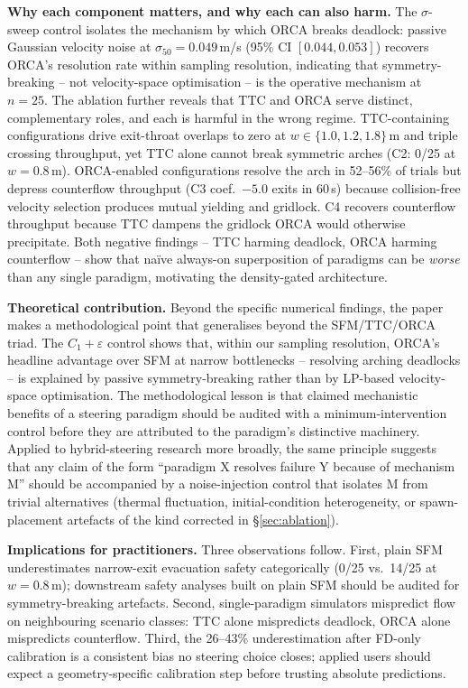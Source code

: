 \documentclass[a4paper,twoside]{article}
\begin{document}
\textbf{Why each component matters, and why each can also harm.}
The $\sigma$-sweep control isolates the mechanism by which ORCA breaks deadlock: passive Gaussian velocity noise at $\sigma_{50}=0.049$\,m/s (95\% CI $[0.044,0.053]$) recovers ORCA's resolution rate within sampling resolution, indicating that symmetry-breaking -- not velocity-space optimisation -- is the operative mechanism at $n=25$. The ablation further reveals that TTC and ORCA serve distinct, complementary roles, and each is harmful in the wrong regime. TTC-containing configurations drive exit-throat overlaps to zero at $w\!\in\!\{1.0,1.2,1.8\}$\,m and triple crossing throughput, yet TTC alone cannot break symmetric arches (C2: 0/25 at $w=0.8$\,m). ORCA-enabled configurations resolve the arch in 52--56\% of trials but depress counterflow throughput (C3 coef.\ $-5.0$ exits in 60\,s) because collision-free velocity selection produces mutual yielding and gridlock. C4 recovers counterflow throughput because TTC dampens the gridlock ORCA would otherwise precipitate. Both negative findings -- TTC harming deadlock, ORCA harming counterflow -- show that na\"ive always-on superposition of paradigms can be \emph{worse} than any single paradigm, motivating the density-gated architecture.

\textbf{Theoretical contribution.}
Beyond the specific numerical findings, the paper makes a methodological point that generalises beyond the SFM/TTC/ORCA triad. The $C_1{+}\varepsilon$ control shows that, within our sampling resolution, ORCA's headline advantage over SFM at narrow bottlenecks -- resolving arching deadlocks -- is explained by passive symmetry-breaking rather than by LP-based velocity-space optimisation. The methodological lesson is that claimed mechanistic benefits of a steering paradigm should be audited with a minimum-intervention control before they are attributed to the paradigm's distinctive machinery. Applied to hybrid-steering research more broadly, the same principle suggests that any claim of the form ``paradigm X resolves failure Y because of mechanism M'' should be accompanied by a noise-injection control that isolates M from trivial alternatives (thermal fluctuation, initial-condition heterogeneity, or spawn-placement artefacts of the kind corrected in \S\ref{sec:ablation}).

\textbf{Implications for practitioners.}
Three observations follow. First, plain SFM underestimates narrow-exit evacuation safety categorically (0/25 vs.\ 14/25 at $w=0.8$\,m); downstream safety analyses built on plain SFM should be audited for symmetry-breaking artefacts. Second, single-paradigm simulators mispredict flow on neighbouring scenario classes: TTC alone mispredicts deadlock, ORCA alone mispredicts counterflow. Third, the 26--43\% underestimation after FD-only calibration is a consistent bias no steering choice closes; applied users should expect a geometry-specific calibration step before trusting absolute predictions.
\end{document}
